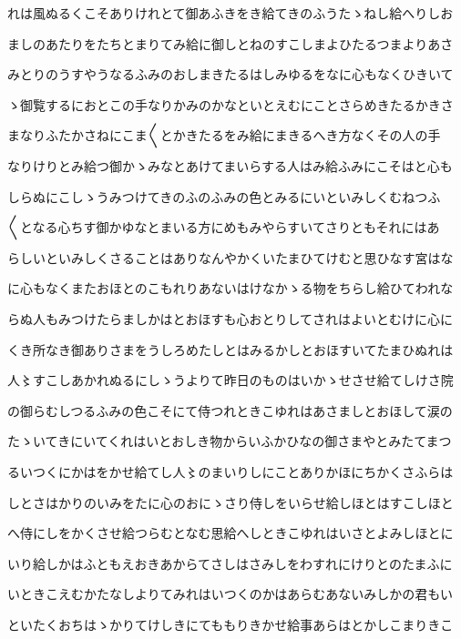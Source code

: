 \documentclass[a4paper,11pt,landscape]{ltjtarticle}
\begin{document}
\par\medskip
れは風ぬるくこそありけれとて御あふきをき給てきのふうたゝねし給へりしお
\par\medskip
ましのあたりをたちとまりてみ給に御しとねのすこしまよひたるつまよりあさ
\par\medskip
みとりのうすやうなるふみのおしまきたるはしみゆるをなに心もなくひきいて
\par\medskip
ゝ御覧するにおとこの手なりかみのかなといとえむにことさらめきたるかきさ
\par\medskip
まなりふたかさねにこま〱とかきたるをみ給にまきるへき方なくその人の手
\par\medskip
なりけりとみ給つ御かゝみなとあけてまいらする人はみ給ふみにこそはと心も
\par\medskip
しらぬにこしゝうみつけてきのふのふみの色とみるにいといみしくむねつふ
\par\medskip
〱となる心ちす御かゆなとまいる方にめもみやらすいてさりともそれにはあ
\par\medskip
らしいといみしくさることはありなんやかくいたまひてけむと思ひなす宮はな
\par\medskip
に心もなくまたおほとのこもれりあないはけなかゝる物をちらし給ひてわれな
\par\medskip
らぬ人もみつけたらましかはとおほすも心おとりしてされはよいとむけに心に
\par\medskip
くき所なき御ありさまをうしろめたしとはみるかしとおほすいてたまひぬれは
\par\medskip
人〻すこしあかれぬるにしゝうよりて昨日のものはいかゝせさせ給てしけさ院
\par\medskip
の御らむしつるふみの色こそにて侍つれときこゆれはあさましとおほして涙の
\par\medskip
たゝいてきにいてくれはいとおしき物からいふかひなの御さまやとみたてまつ
\par\medskip
るいつくにかはをかせ給てし人〻のまいりしにことありかほにちかくさふらは
\par\medskip
しとさはかりのいみをたに心のおにゝさり侍しをいらせ給しほとはすこしほと
\par\medskip
へ侍にしをかくさせ給つらむとなむ思給へしときこゆれはいさとよみしほとに
\par\medskip
いり給しかはふともえおきあからてさしはさみしをわすれにけりとのたまふに
\par\medskip
いときこえむかたなしよりてみれはいつくのかはあらむあないみしかの君もい
\par\medskip
といたくおちはゝかりてけしきにてももりきかせ給事あらはとかしこまりきこ
\par\medskip
\end{document}
